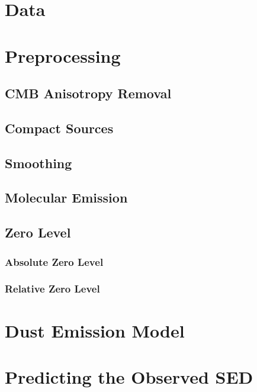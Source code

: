 \documentclass{emulateapj}
\begin{document}

\section{Data}
\label{sec:data}

\section{Preprocessing}
\label{sec:prepro}

\subsection{CMB Anisotropy Removal}
\label{sec:cmb}

\subsection{Compact Sources}
\label{sec:ptsrc}

\subsection{Smoothing}
\label{sec:smth}

\subsection{Molecular Emission}
\label{sec:mole}

\subsection{Zero Level}
\label{sec:zp}

\subsubsection{Absolute Zero Level}
\label{sec:zp_abs}

\subsubsection{Relative Zero Level}
\label{sec:relzero}

\section{Dust Emission Model}
\label{sec:modeling}

\section{Predicting the Observed SED}
\label{sec:bpcorr}
\end{document}

